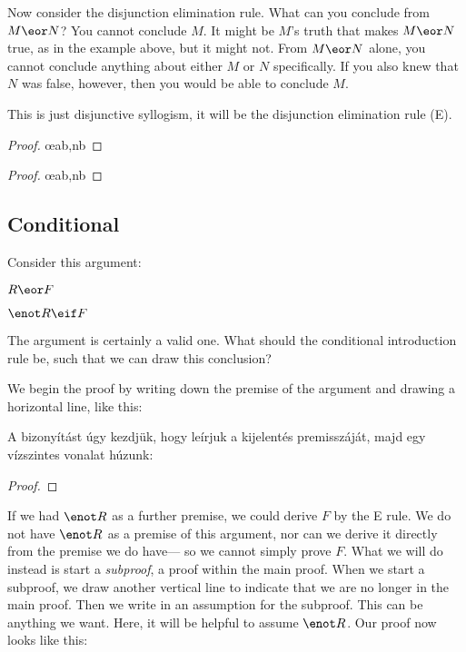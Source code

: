 Now consider the disjunction elimination rule. What can you conclude from $M \eor N$? You cannot conclude $M$. It might be $M$'s truth that makes $M \eor N$ true, as in the example above, but it might not. From $M \eor N$ alone, you cannot conclude anything about either $M$ or $N$ specifically. If you also knew that $N$ was false, however, then you would be able to conclude $M$.

This is just disjunctive syllogism, it will be the disjunction elimination rule ({\eor}E).
\begin{multicols}{2}
\begin{proof}
	 \oe{ab,nb}
\end{proof}

\begin{proof}
	 \oe{ab,nb}
\end{proof}

\end{multicols}

\subsection{Conditional}

Consider this argument:
\begin{earg}
\item[] $R \eor F$
\item[\therefore] $\enot R \eif F$
\end{earg}
The argument is certainly a valid one. What should the conditional introduction rule be, such that we can draw this conclusion?



We begin the proof by writing down the premise of the argument and drawing a horizontal line, like this:

A bizonyítást úgy kezdjük, hogy leírjuk a kijelentés premisszáját, majd egy vízszintes vonalat húzunk:

\begin{proof}
\end{proof}

If we had $\enot R$ as a further premise, we could derive $F$ by the {\eor}E rule. We do not have $\enot R$ as a premise of this argument, nor can we derive it directly from the premise we do have--- so we cannot simply prove $F$. What we will do instead is start a \emph{subproof}, a proof within the main proof. When we start a subproof, we draw another vertical line to indicate that we are no longer in the main proof. Then we write in an assumption for the subproof. This can be anything we want. Here, it will be helpful to assume $\enot R$. Our proof now looks like this:

